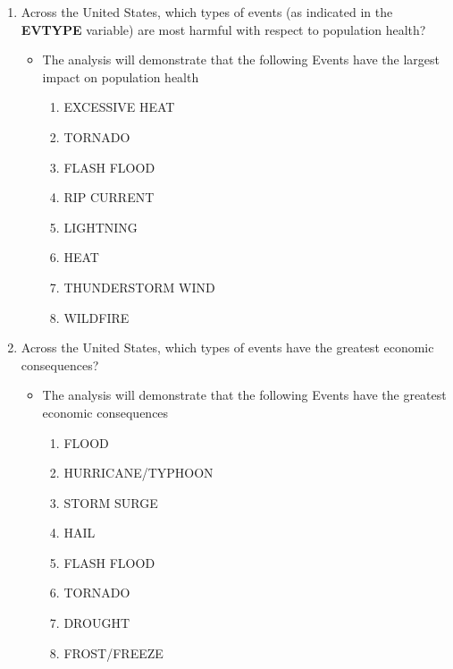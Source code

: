 \documentclass[]{article}
\providecommand{\tightlist}{%
  \setlength{\itemsep}{0pt}\setlength{\parskip}{0pt}}
\begin{document}
\begin{enumerate}
\def\labelenumi{\arabic{enumi}.}
\tightlist
\item
  Across the United States, which types of events (as indicated in the
  \textbf{EVTYPE} variable) are most harmful with respect to population
  health?

  \begin{itemize}
  \tightlist
  \item
    The analysis will demonstrate that the following Events have the
    largest impact on population health

    \begin{enumerate}
    \def\labelenumii{\arabic{enumii}.}
    \tightlist
    \item
      EXCESSIVE HEAT
    \item
      TORNADO
    \item
      FLASH FLOOD
    \item
      RIP CURRENT
    \item
      LIGHTNING
    \item
      HEAT
    \item
      THUNDERSTORM WIND
    \item
      WILDFIRE
    \end{enumerate}
  \end{itemize}
\item
  Across the United States, which types of events have the greatest
  economic consequences?

  \begin{itemize}
  \tightlist
  \item
    The analysis will demonstrate that the following Events have the
    greatest economic consequences

    \begin{enumerate}
    \def\labelenumii{\arabic{enumii}.}
    \tightlist
    \item
      FLOOD
    \item
      HURRICANE/TYPHOON
    \item
      STORM SURGE
    \item
      HAIL
    \item
      FLASH FLOOD
    \item
      TORNADO
    \item
      DROUGHT
    \item
      FROST/FREEZE
    \end{enumerate}
  \end{itemize}
\end{enumerate}
\end{document}
